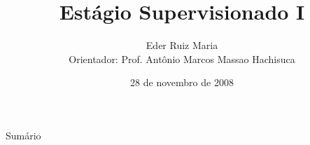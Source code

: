 \documentclass{beamer}
\title[Est\'agio Supervisionado I]{Est\'agio Supervisionado I}
\author[Eder Ruiz Maria]{Eder Ruiz Maria \\
\scriptsize{Orientador: Prof. Antônio Marcos Massao Hachisuca}}
\institute{Universidade Estadual do Oeste do Paraná}
\date{28 de novembro de 2008}
\begin{document}
\frame{\titlepage}

\begin{frame}{Sumário}
	\tableofcontents
\end{frame}

\end{document}
